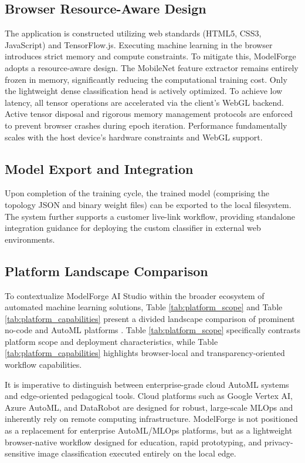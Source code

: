 \documentclass[conference]{IEEEtran}
\begin{document}
\subsection{Browser Resource-Aware Design}
The application is constructed utilizing web standards (HTML5, CSS3, JavaScript) and TensorFlow.js. Executing machine learning in the browser introduces strict memory and compute constraints. To mitigate this, ModelForge adopts a resource-aware design. The MobileNet feature extractor remains entirely frozen in memory, significantly reducing the computational training cost. Only the lightweight dense classification head is actively optimized. To achieve low latency, all tensor operations are accelerated via the client's WebGL backend. Active tensor disposal and rigorous memory management protocols are enforced to prevent browser crashes during epoch iteration. Performance fundamentally scales with the host device's hardware constraints and WebGL support.

\subsection{Model Export and Integration}
Upon completion of the training cycle, the trained model (comprising the topology JSON and binary weight files) can be exported to the local filesystem. The system further supports a customer live-link workflow, providing standalone integration guidance for deploying the custom classifier in external web environments.

\subsection{Platform Landscape Comparison}
To contextualize ModelForge AI Studio within the broader ecosystem of automated machine learning solutions, Table \ref{tab:platform_scope} and Table \ref{tab:platform_capabilities} present a divided landscape comparison of prominent no-code and AutoML platforms \cite{Roboflow, LandingLens, VertexAI, AzureAutoML, SageMakerCanvas, DataRobot}. Table \ref{tab:platform_scope} specifically contrasts platform scope and deployment characteristics, while Table \ref{tab:platform_capabilities} highlights browser-local and transparency-oriented workflow capabilities.

It is imperative to distinguish between enterprise-grade cloud AutoML systems and edge-oriented pedagogical tools. Cloud platforms such as Google Vertex AI, Azure AutoML, and DataRobot are designed for robust, large-scale MLOps and inherently rely on remote computing infrastructure. ModelForge is not positioned as a replacement for enterprise AutoML/MLOps platforms, but as a lightweight browser-native workflow designed for education, rapid prototyping, and privacy-sensitive image classification executed entirely on the local edge.
\end{document}
